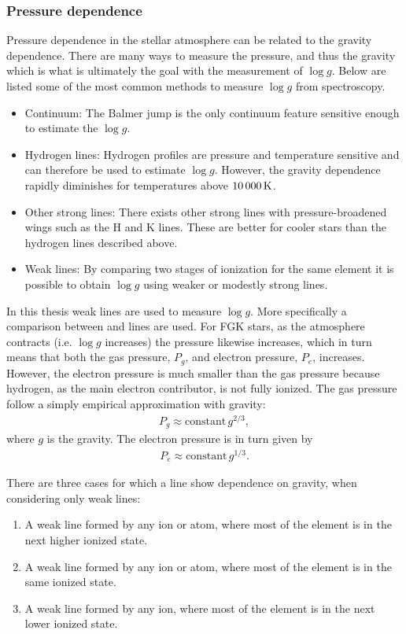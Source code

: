 {\subsubsection{Pressure dependence}

Pressure dependence in the stellar atmosphere can be related to the gravity dependence. There are
many ways to measure the pressure, and thus the gravity which is what is ultimately the goal with
the measurement of $\log g$. Below are listed some of the most common methods to measure $\log g$
from spectroscopy.

\begin{itemize}
  \item Continuum: The Balmer jump is the only continuum feature sensitive enough to estimate the
        $\log g$.
  \item Hydrogen lines: Hydrogen profiles are pressure and temperature sensitive and can therefore
        be used to estimate $\log g$. However, the gravity dependence rapidly diminishes for
        temperatures above $\SI{10\,000}{K}$.
  \item Other strong lines: There exists other strong lines with pressure-broadened wings such as
        the  H and K lines. These are better for cooler stars than the hydrogen lines
        described above.
  \item Weak lines: By comparing two stages of ionization for the same element it is possible to
        obtain $\log g$ using weaker or modestly strong lines.
\end{itemize}
In this thesis weak lines are used to measure $\log g$. More specifically a comparison between
 and  lines are used. For FGK stars, as the atmosphere contracts (i.e. $\log
g$ increases) the pressure likewise increases, which in turn means that both the gas pressure,
$P_g$, and electron pressure, $P_e$, increases. However, the electron pressure is much smaller than
the gas pressure because hydrogen, as the main electron contributor, is not fully ionized. The gas
pressure follow a simply empirical approximation with gravity:
\begin{align}
  P_g \approx \mathrm{constant}\, g^{2/3},
\end{align}
where $g$ is the gravity. The electron pressure is in turn given by
\begin{align}
  P_e \approx \mathrm{constant}\, g^{1/3}.
\end{align}

There are three cases for which a line show dependence on gravity, when considering only weak lines:
\begin{enumerate}
  \item A weak line formed by any ion or atom, where most of the element is in the next higher ionized state.
  \item A weak line formed by any ion or atom, where most of the element is in the same ionized state.
  \item A weak line formed by any ion, where most of the element is in the next lower ionized state.
\end{enumerate}

}
